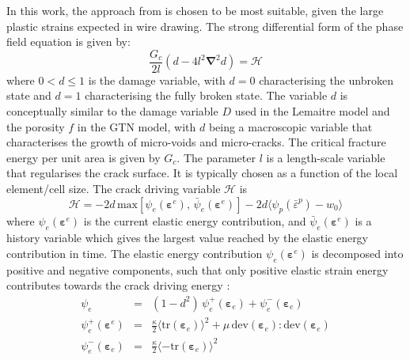 \documentclass[sn-mathphys,Numbered]{sn-jnl}%
\newcommand{\bb}{\boldsymbol}
\begin{document}
In this work, the approach from \citet{borden_phase-field_2016} is chosen to be most suitable, given the large plastic strains expected in wire drawing.
The strong differential form of the phase field equation is given by:
\begin{equation} \label{eqn:phaseFieldEquation}
	\frac{G_c}{2l} \left(d - 4 l^2 \bb{\nabla}^2 d \right) = \mathcal{H} %
\end{equation}
where $0 < d \leq 1$ is the damage variable, with $d = 0$ characterising the unbroken state and $d = 1$ characterising the fully broken state. 
The variable $d$ is conceptually similar to the damage variable $D$ used in the Lemaitre model and the porosity $f$ in the GTN model, with $d$ being a macroscopic variable that characterises the growth of micro-voids and micro-cracks.
The critical fracture energy per unit area is given by $G_c$.
The parameter $l$ is a length-scale variable that regularises the crack surface. It is typically chosen as a function of the local element/cell size.
The crack driving variable $\mathcal{H}$ is
\begin{equation}
	\mathcal{H} %
	=
		-2d \,
		\text{max}
		\left[
			\psi_e
			\left(\bb{\varepsilon}^e\right), \,
			\bar{\psi}_{e}\left(\bb{\varepsilon}^e\right)
		\right]
	-2d
	\langle \psi_p({\bar{\varepsilon}}^p)-w_0 \rangle
\end{equation}
where $\psi_e \left(\bb{\varepsilon}^e\right)$ is the current elastic energy contribution, and $\bar{\psi}_e \left(\bb{\varepsilon}^e\right)$ is a history variable which gives the largest value reached by the elastic energy contribution in time.
The elastic energy contribution $\psi_e \left(\bb{\varepsilon}^e\right)$ is decomposed into positive and negative components, such that only positive elastic strain energy contributes towards the crack driving energy \citep{amor_regularized_2009}:
\begin{eqnarray}
	\psi_e &=&
	(1 - d^2) \, \psi_{e}^{+} \left(\bb{\varepsilon}_e \right)
	+ \psi_{e}^{-} \left(\bb{\varepsilon}_e \right) \\
	\psi_e^{+}\left(\bb{\varepsilon}^{e}\right) &=&
	\frac{\kappa}{2} \langle \text{tr}\left(\bb{\varepsilon}_{e}\right)\rangle^2
	+\mu \,\text{dev}(\bb{\varepsilon}_e): \text{dev}(\bb{\varepsilon}_e) \\
    	\psi_e^{-} \left(\bb{\varepsilon}_{e}\right) &=&
	\frac{\kappa}{2} \langle-\text{tr}\left(\bb{\varepsilon}_{e}\right) \rangle^2
\end{eqnarray}
\end{document}
